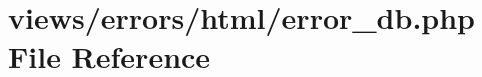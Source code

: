 \hypertarget{html_2error__db_8php}{}\section{views/errors/html/error\+\_\+db.php File Reference}
\label{html_2error__db_8php}
